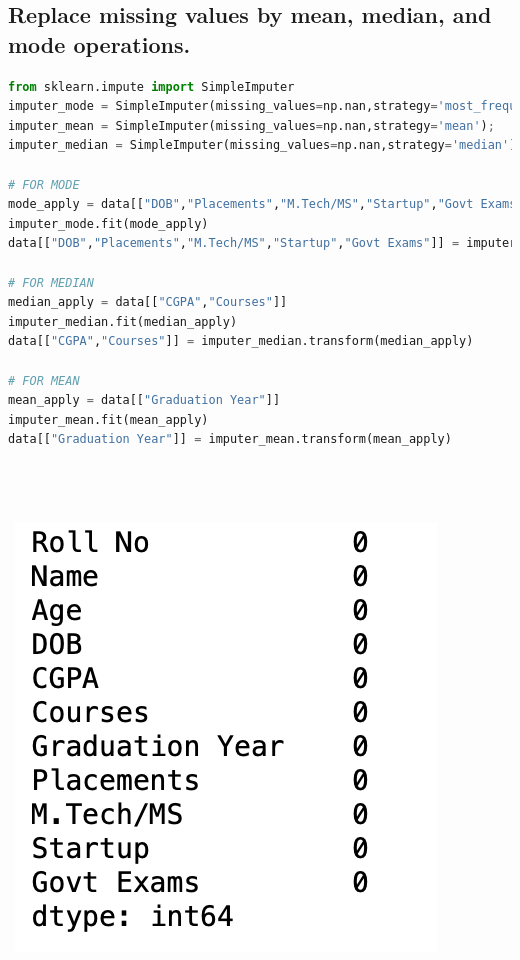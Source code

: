 \documentclass{article}
\begin{document}
\subsection{Replace missing values by mean, median, and mode operations.}
\begin{lstlisting}[language=Python]
from sklearn.impute import SimpleImputer
imputer_mode = SimpleImputer(missing_values=np.nan,strategy='most_frequent');
imputer_mean = SimpleImputer(missing_values=np.nan,strategy='mean');
imputer_median = SimpleImputer(missing_values=np.nan,strategy='median');

# FOR MODE
mode_apply = data[["DOB","Placements","M.Tech/MS","Startup","Govt Exams"]]
imputer_mode.fit(mode_apply)
data[["DOB","Placements","M.Tech/MS","Startup","Govt Exams"]] = imputer_mode.transform(mode_apply)

# FOR MEDIAN
median_apply = data[["CGPA","Courses"]]
imputer_median.fit(median_apply)
data[["CGPA","Courses"]] = imputer_median.transform(median_apply)

# FOR MEAN
mean_apply = data[["Graduation Year"]]
imputer_mean.fit(mean_apply)
data[["Graduation Year"]] = imputer_mean.transform(mean_apply)
    
\end{lstlisting}\\\\\
\includegraphics[scale=0.90]{images/six.png}
\end{document}

